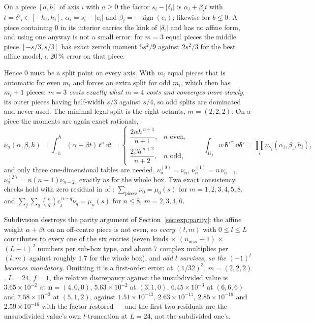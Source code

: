 \begin{lemma}
\label{lem:exp:straddle}
On a piece $[a,b]$ of axis $i$ with $a \ge 0$ the factor $s_i - |\delta_i|$ is
$\alpha_i + \beta_i t$ with $t = \delta'_i \in [-h_i,h_i]$,
$\alpha_i = s_i - |c_i|$ and $\beta_i = -\operatorname{sign}(c_i)$; likewise for
$b \le 0$. A piece containing $0$ in its interior carries the kink of $|\delta_i|$ and has
no affine form, and using one anyway is not a small error: for $m = 3$ equal pieces the
middle piece $[-s/3,s/3]$ has exact zeroth moment $5s^2/9$ against $2s^2/3$ for the best
affine model, a $20\,\%$ error on that piece.
\end{lemma}

Hence $0$ must be a split point on every axis. With $m_i$ equal pieces that is automatic
for even $m_i$ and forces an extra split for odd $m_i$, which then has $m_i+1$ pieces:
\emph{$m = 3$ costs exactly what $m = 4$ costs and converges more slowly}, its outer
pieces having half-width $s/3$ against $s/4$, so odd splits are dominated and never used.
The minimal legal split is the eight octants, $m = (2,2,2)$. On a piece the moments are
again exact rationals,
\begin{equation}
\nu_n(\alpha,\beta,h) = \int_{-h}^{h}(\alpha+\beta t)\,t^n\,\dd t
= \begin{cases} \dfrac{2\alpha h^{\,n+1}}{n+1}, & n \text{ even},\\[4pt]
                \dfrac{2\beta h^{\,n+2}}{n+2}, & n \text{ odd},\end{cases}
\qquad
\int_{D_j} w\,\boldsymbol{\delta}'^{\boldsymbol{\gamma}}\,\dd\boldsymbol{\delta}'
= \prod_i \nu_{\gamma_i}(\alpha_i,\beta_i,h_i),
\label{eq:exp:nu}
\end{equation}
and only three one-dimensional tables are needed, $\nu^{(0)}_n = \nu_n$,
$\nu^{(1)}_n = n\,\nu_{n-1}$, $\nu^{(2)}_n = n(n-1)\nu_{n-2}$, exactly as for the whole
box. Two exact consistency checks hold with zero residual in
 of : $\sum_{\text{pieces}}\nu_0 = \mu_0(s)$ for
$m = 1,2,3,4,5,8$, and $\sum_j\sum_q \binom{n}{q}c_j^{\,n-q}\nu_q = \mu_n(s)$ for
$n \le 8$, $m = 2,3,4,6$.

Subdivision destroys the parity argument of Section~\ref{sec:exp:parity}: the affine
weight $\alpha+\beta t$ on an off-centre piece is not even, so \emph{every} $(l,m)$ with
$0 \le l \le L$ contributes to every one of the six entries (seven kinds $\times$
$(n_{\max}+1)$ $\times$ $(L+1)^2$ numbers per sub-box type, and about $7$ complex
multiplies per $(l,m)$ against roughly $1.7$ for the whole box), and \emph{odd $l$
survives, so the $(-1)^l$ becomes mandatory}. Omitting it is a first-order error: at
$(1/32)^3$, $m = (2,2,2)$, $L = 24$, $f = 1$, the relative discrepancy against the
unsubdivided value is $3.65\times10^{-2}$ at $\mathbf{n} = (4,0,0)$,
$5.63\times10^{-2}$ at $(3,1,0)$, $6.45\times10^{-3}$ at $(6,6,6)$ and
$7.58\times10^{-3}$ at $(5,1,2)$, against $1.51\times10^{-13}$,
$2.63\times10^{-11}$, $2.85\times10^{-16}$ and $2.59\times10^{-16}$ with the factor
restored --- and the first two residuals are the unsubdivided value's own $l$-truncation
at $L = 24$, not the subdivided one's.

